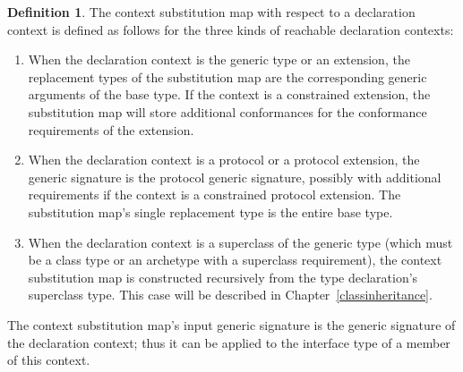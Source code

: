 \documentclass[a4paper,headsepline,bibliography=totoc,toc=flat,fleqn,twoside=semi]{scrbook}
\theoremstyle{definition}
\newtheorem{definition}{Definition}[chapter]
\theoremstyle{definition}
\theoremstyle{definition}
\begin{document}
\begin{definition}\label{context substitution map for decl context} The context substitution map with respect to a declaration context is defined as follows for the three kinds of reachable declaration contexts:
\begin{enumerate}
\item When the declaration context is the generic type or an extension, the replacement types of the substitution map are the corresponding generic arguments of the base type. If the context is a constrained extension, the substitution map will store additional conformances for the conformance requirements of the extension.
\item When the declaration context is a protocol or a protocol extension, the generic signature is the protocol generic signature, possibly with additional requirements if the context is a constrained protocol extension. The substitution map's single replacement type is the entire base type.
\item When the declaration context is a superclass of the generic type (which must be a class type or an archetype with a superclass requirement), the context substitution map is constructed recursively from the type declaration's superclass type. This case will be described in Chapter~\ref{classinheritance}.
\end{enumerate}
The context substitution map's input generic signature is the generic signature of the declaration context; thus it can be applied to the interface type of a member of this context.
\end{definition}
\end{document}
